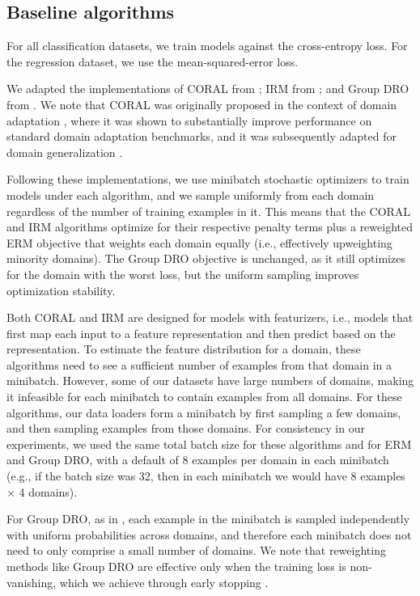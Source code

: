 \subsection{Baseline algorithms}
For all classification datasets, we train models against the cross-entropy loss. For the \PovertyMap regression dataset, we use the mean-squared-error loss.

We adapted the implementations of CORAL from \citet{gulrajani2020search};
IRM from \citet{arjovsky2019invariant}; and Group DRO from \citet{sagawa2020group}.
We note that CORAL was originally proposed in the context of domain adaptation \citep{sun2016deep}, where it was shown to substantially improve performance on standard domain adaptation benchmarks, and it was subsequently adapted for domain generalization \citep{gulrajani2020search}.

Following these implementations, we use minibatch stochastic optimizers to train models under each algorithm, and we sample uniformly from each domain regardless of the number of training examples in it.
This means that the CORAL and IRM algorithms optimize for their respective penalty terms plus a reweighted ERM objective that weights each domain equally (i.e., effectively upweighting minority domains).
The Group DRO objective is unchanged, as it still optimizes for the domain with the worst loss, but the uniform sampling improves optimization stability.

Both CORAL and IRM are designed for models with featurizers, i.e., models that first map each input to a feature representation and then predict based on the representation.
To estimate the feature distribution for a domain, these algorithms need to see a sufficient number of examples from that domain in a minibatch.
However, some of our datasets have large numbers of domains, making it infeasible for each minibatch to contain examples from all domains.
For these algorithms, our data loaders form a minibatch by first sampling a few domains, and then sampling examples from those domains.
For consistency in our experiments, we used the same total batch size for these algorithms and for ERM and Group DRO, with a default of 8 examples per domain in each minibatch (e.g., if the batch size was 32, then in each minibatch we would have 8 examples $\times$ 4 domains).

For Group DRO, as in \citet{sagawa2020group}, each example in the minibatch is sampled independently with uniform probabilities across domains, and therefore each minibatch does not need to only comprise a small number of domains.
We note that reweighting methods like Group DRO are effective only when the training loss is non-vanishing, which we achieve through early stopping \citep{byrd2019effect,sagawa2020group,sagawa2020overparameterization}.
